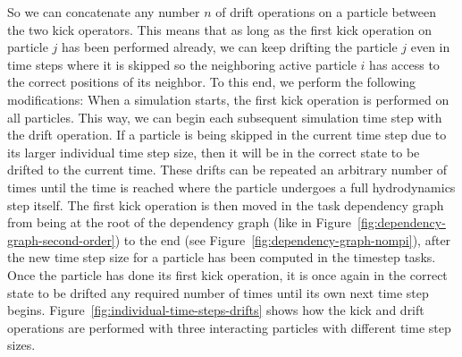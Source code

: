 So we can concatenate any number $n$ of drift operations on a particle between the two kick
operators. This means that as long as the first kick operation on particle $j$ has been performed
already, we can keep drifting the particle $j$ even in time steps where it is skipped so the
neighboring active particle $i$ has access to the correct positions of its neighbor. To this end,
we perform the following modifications: When a simulation starts, the first kick operation is
performed on all particles. This way, we can begin each subsequent simulation time step with the
drift operation. If a particle is being skipped in the current time step due to its larger
individual time step size, then it will be in the correct state to be drifted to the current time.
These drifts can be repeated an arbitrary number of times until the time is reached where the
particle undergoes a full hydrodynamics step itself. The first kick operation is then moved in the
task dependency graph from being at the root of the dependency graph (like in
Figure~\ref{fig:dependency-graph-second-order}) to the end (see
Figure~\ref{fig:dependency-graph-nompi}), after the new time step size for a
particle has been computed in the timestep tasks. Once the particle has done its first kick
operation, it is once again in the correct state to be drifted any required number of times until
its own next time step begins. Figure~\ref{fig:individual-time-steps-drifts} shows how the kick and
drift operations are performed with three interacting particles with different time step sizes.


